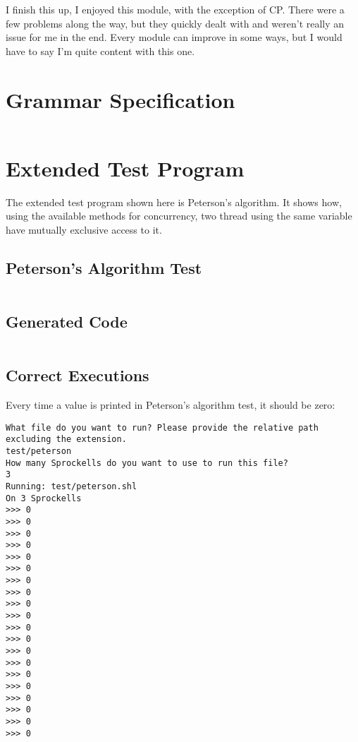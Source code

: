 \documentclass[twoside]{report}
\begin{document}
I finish this up, I enjoyed this module, with the exception of CP. There were a few problems along the way, but they quickly dealt with and weren't really an issue for me in the end. Every module can improve in some ways, but I would have to say I'm quite content with this one.


\begin{appendices}
\label{appendices}


\chapter{Grammar Specification}
\label{grammar_specification}
\begin{landscape}
\inputminted[firstline=66, lastline=138, tabsize=4]{haskell}{../../src/haskell/PP-project-2016/Grammar.hs}
\end{landscape}


\chapter{Extended Test Program}
\label{extended_test_program}
The extended test program shown here is Peterson's algorithm. It shows how, using the available methods for concurrency, two thread using the same variable have mutually exclusive access to it.

\section{Peterson's Algorithm Test}
\inputminted[tabsize=4,linenos,firstnumber=1]{text}{../../src/haskell/PP-project-2016/test/peterson.shl}

\section{Generated Code}
\inputminted[tabsize=4,linenos,firstnumber=0]{text}{../../src/haskell/PP-project-2016/test/peterson_gen.txt}

\section{Correct Executions}
Every time a value is printed in Peterson's algorithm test, it should be zero:
\begin{verbatim}
What file do you want to run? Please provide the relative path excluding the extension.
test/peterson
How many Sprockells do you want to use to run this file?
3
Running: test/peterson.shl
On 3 Sprockells
>>> 0
>>> 0
>>> 0
>>> 0
>>> 0
>>> 0
>>> 0
>>> 0
>>> 0
>>> 0
>>> 0
>>> 0
>>> 0
>>> 0
>>> 0
>>> 0
>>> 0
>>> 0
>>> 0
>>> 0
\end{verbatim}


\end{appendices}
\end{document}
